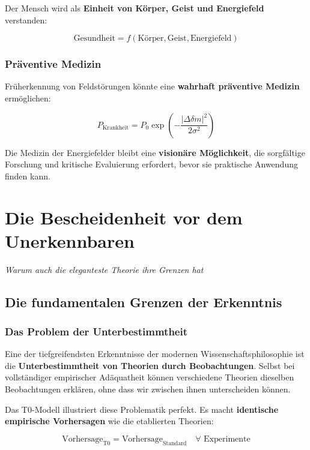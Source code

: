 \documentclass[12pt,a4paper]{report}
\begin{document}
	Der Mensch wird als \textbf{Einheit von Körper, Geist und Energiefeld} verstanden:
	
	\begin{equation}
		\text{Gesundheit} = f(\text{Körper}, \text{Geist}, \text{Energiefeld})
	\end{equation}
	
	\subsection{Präventive Medizin}
	
	Früherkennung von Feldstörungen könnte eine \textbf{wahrhaft präventive Medizin} ermöglichen:
	
	\begin{equation}
		P_{\text{Krankheit}} = P_0 \exp\left(-\frac{|\Delta\delta m|^2}{2\sigma^2}\right)
	\end{equation}
	
	Die Medizin der Energiefelder bleibt eine \textbf{visionäre Möglichkeit}, die sorgfältige Forschung und kritische Evaluierung erfordert, bevor sie praktische Anwendung finden kann.
	\chapter{Die Bescheidenheit vor dem Unerkennbaren}
	\textit{Warum auch die eleganteste Theorie ihre Grenzen hat}
	
	\section{Die fundamentalen Grenzen der Erkenntnis}
	
	\subsection{Das Problem der Unterbestimmtheit}
	
	Eine der tiefgreifendsten Erkenntnisse der modernen Wissenschaftsphilosophie ist die \textbf{Unterbestimmtheit von Theorien durch Beobachtungen}. Selbst bei vollständiger empirischer Adäquatheit können verschiedene Theorien dieselben Beobachtungen erklären, ohne dass wir zwischen ihnen unterscheiden können.
	
	Das T0-Modell illustriert diese Problematik perfekt. Es macht \textbf{identische empirische Vorhersagen} wie die etablierten Theorien:
	
	\begin{equation}
		\text{Vorhersage}_{\text{T0}} = \text{Vorhersage}_{\text{Standard}} \quad \forall \text{ Experimente}
	\end{equation}
	
\end{document}
